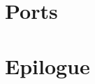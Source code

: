 \documentclass[8pt]{book}
\begin{document}

    
    
    
    
    


%       


%       
  
%       

  
%       
      
%        
%        
%       
%        
%        
%       
%        
    
  
           


%         
        

    \chapter{Ports}        
        
        
    
       \chapter{Epilogue}
        
\end{document}
